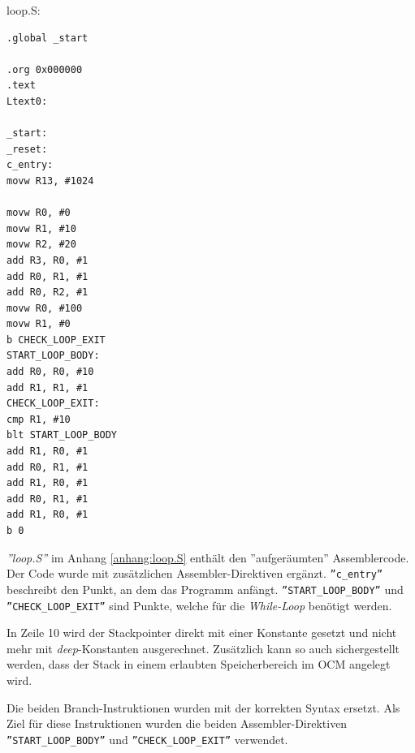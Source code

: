 \FloatBarrier

loop.S:
\begin{lstlisting}
.global _start

.org 0x000000
.text
Ltext0:

_start:
_reset:
c_entry:
movw R13, #1024

movw R0, #0
movw R1, #10
movw R2, #20
add R3, R0, #1
add R0, R1, #1
add R0, R2, #1
movw R0, #100
movw R1, #0
b CHECK_LOOP_EXIT	
START_LOOP_BODY:
add R0, R0, #10
add R1, R1, #1
CHECK_LOOP_EXIT:
cmp R1, #10
blt START_LOOP_BODY
add R1, R0, #1
add R0, R1, #1
add R1, R0, #1
add R0, R1, #1
add R1, R0, #1
b 0
\end{lstlisting}

\textit{''loop.S''} im Anhang \ref{anhang:loop.S} enthält den ''aufgeräumten'' Assemblercode.
Der Code wurde mit zusätzlichen Assembler-Direktiven ergänzt.
\texttt{''c\_entry''} beschreibt den Punkt, an dem das Programm anfängt.
\texttt{''START\_LOOP\_BODY''} und \texttt{''CHECK\_LOOP\_EXIT''} sind Punkte, welche für die \textit{While-Loop} benötigt werden.

In Zeile 10 wird der Stackpointer direkt mit einer Konstante gesetzt und nicht mehr mit \textit{deep}-Konstanten ausgerechnet.
Zusätzlich kann so auch sichergestellt werden, dass der Stack in einem erlaubten Speicherbereich im OCM angelegt wird.

Die beiden Branch-Instruktionen wurden mit der korrekten Syntax ersetzt.
Als Ziel für diese Instruktionen wurden die beiden Assembler-Direktiven \texttt{''START\_LOOP\_BODY''} und \texttt{''CHECK\_LOOP\_EXIT''} verwendet.



